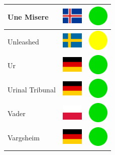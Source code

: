 \documentclass[12pt, a4paper, twoside]{report}
\begin{document}
\begin{center}
\begin{longtable}{|p{5cm}|p{2cm}|p{2cm}|}
 Une Misere                                                 & \includegraphics[width=1cm]{../4x3/is} &   \includegraphics[width=1cm]{../likes/y} \\ \hline
 Unleashed                                                  & \includegraphics[width=1cm]{../4x3/se} &   \includegraphics[width=1cm]{../likes/m} \\ \hline
 Ur                                                         & \includegraphics[width=1cm]{../4x3/de} &   \includegraphics[width=1cm]{../likes/y} \\ \hline
 Urinal Tribunal                                            & \includegraphics[width=1cm]{../4x3/de} &   \includegraphics[width=1cm]{../likes/y} \\ \hline
 Vader                                                      & \includegraphics[width=1cm]{../4x3/pl} &   \includegraphics[width=1cm]{../likes/y} \\ \hline
 Vargsheim                                                  & \includegraphics[width=1cm]{../4x3/de} &   \includegraphics[width=1cm]{../likes/y} \\ \hline

\end{longtable}
\end{center}
\end{document}
